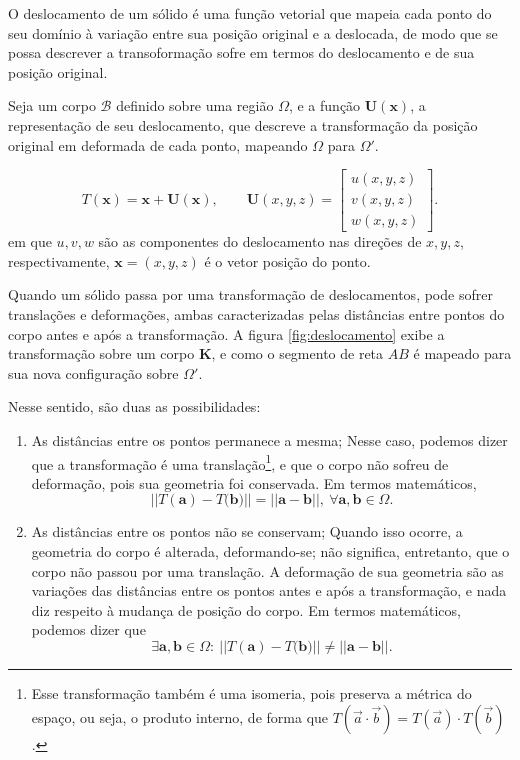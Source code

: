 O deslocamento de um sólido é uma função vetorial que mapeia cada ponto do seu domínio à variação entre sua posição original e a deslocada, de modo que se possa descrever a transoformação sofre em termos do deslocamento e de sua posição original. 

Seja um corpo $\mathcal{B}$ definido sobre uma região $\Omega$, e a função $\bm{U}(\bm{x})$, a representação de seu deslocamento, que descreve a transformação da posição original em deformada de cada ponto, mapeando $\Omega$ para $\Omega'$.

\begin{equation}
    T(\bm{x}) = \bm{x} + \bm{U}(\bm{x}), \qquad
    \bm{U}(x,y,z) = \begin{bmatrix}
        u(x,y,z) \\ v(x,y,z) \\ w(x,y,z) 
    \end{bmatrix}.
    \label{eq:transformacao}
\end{equation}
em que $u, v, w$ são as componentes do deslocamento nas direções de $x, y, z$, respectivamente,  $\bm{x} = (x,y,z)$ é o vetor posição do ponto.



Quando um sólido passa por uma transformação de deslocamentos, pode sofrer translações e deformações, ambas caracterizadas pelas distâncias entre pontos do corpo antes e após a transformação. A figura \ref{fig:deslocamento} exibe a transformação sobre um corpo $\bm{K}$, e como o segmento de reta $AB$ é mapeado para sua nova configuração sobre $\Omega'$.

Nesse sentido, são duas as possibilidades:
\begin{enumerate}
    \item As distâncias entre os pontos permanece a mesma;
        Nesse caso, podemos dizer que a transformação é uma translação\footnote{Esse transformação também é uma isomeria, pois preserva a métrica do espaço, ou seja, o produto interno, de forma que $ T(\vec{a} \cdot \vec{b}) = T(\vec{a}) \cdot T(\vec{b}) $.}, e que o corpo não sofreu de deformação, pois sua geometria foi conservada. Em termos matemáticos,
        \begin{equation}
            ||{T(\bm{a}) - T(\bm{b}})|| = ||{\bm{a} - \bm{b}}||, \ \forall \bm{a}, \bm{b} \in \Omega. 
        \end{equation}        
    \item As distâncias entre os pontos não se conservam;
        Quando isso ocorre, a geometria do corpo é alterada, deformando-se; não significa, entretanto, que o corpo não passou por uma translação. A deformação de sua geometria são as variações das distâncias entre os pontos antes e após a transformação, e nada diz respeito à mudança de posição do corpo. Em termos matemáticos, podemos dizer que
        \begin{equation}
             \exists \bm{a}, \bm{b} \in \Omega : \ ||{T(\bm{a}) - T(\bm{b}})|| \neq ||{\bm{a} - \bm{b}}||.
        \end{equation}
\end{enumerate}


